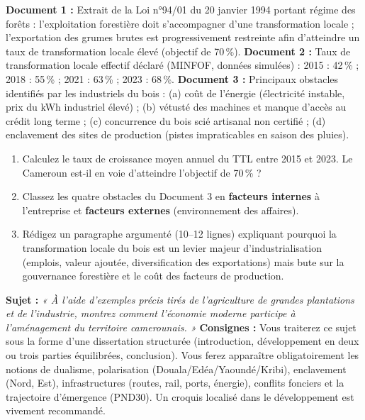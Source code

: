 \documentclass[11pt]{article}
\newcommand{\cle}[1]{{\popxbold\color{popdark}#1}}
\newcounter{popsec}
\newcounter{popsub}
\newcommand{\courssub}[1]{%
  \stepcounter{popsub}%
  \par\vspace{9pt}\noindent{\popxbold\fontsize{11.5}{13}\selectfont\color{popink}{\color{poporange}\thepopsec.\thepopsub}\hspace{6pt}#1}\par\nopagebreak\vspace{4pt}
}
\begin{document}
\begin{exercice}
\textbf{Document 1 :} Extrait de la Loi n°94/01 du 20 janvier 1994 portant régime des forêts : l'exploitation forestière doit s'accompagner d'une transformation locale ; l'exportation des grumes brutes est progressivement restreinte afin d'atteindre un taux de transformation locale élevé (objectif de 70\,\%).
\textbf{Document 2 :} Taux de transformation locale effectif déclaré (MINFOF, données simulées) : 2015 : 42\,\% ; 2018 : 55\,\% ; 2021 : 63\,\% ; 2023 : 68\,\%.
\textbf{Document 3 :} Principaux obstacles identifiés par les industriels du bois : (a) coût de l'énergie (électricité instable, prix du kWh industriel élevé) ; (b) vétusté des machines et manque d'accès au crédit long terme ; (c) concurrence du bois scié artisanal non certifié ; (d) enclavement des sites de production (pistes impraticables en saison des pluies).
\begin{enumerate}
    \item Calculez le taux de croissance moyen annuel du TTL entre 2015 et 2023. Le Cameroun est-il en voie d'atteindre l'objectif de 70\,\% ?
    \item Classez les quatre obstacles du Document 3 en \textbf{facteurs internes} à l'entreprise et \textbf{facteurs externes} (environnement des affaires).
    \item Rédigez un paragraphe argumenté (10--12 lignes) expliquant pourquoi la transformation locale du bois est un levier majeur d'industrialisation (emplois, valeur ajoutée, diversification des exportations) mais bute sur la gouvernance forestière et le coût des facteurs de production.
\end{enumerate}
\end{exercice}

\courssub{Je me prépare au Bac}

\begin{exercice}
\textbf{Sujet :} \emph{« À l'aide d'exemples précis tirés de l'agriculture de grandes plantations et de l'industrie, montrez comment l'économie moderne participe à l'aménagement du territoire camerounais. »}
\textbf{Consignes :} Vous traiterez ce sujet sous la forme d'une dissertation structurée (introduction, développement en deux ou trois parties équilibrées, conclusion). Vous ferez apparaître obligatoirement les notions de \cle{dualisme}, \cle{polarisation} (Douala/Edéa/Yaoundé/Kribi), \cle{enclavement} (Nord, Est), \cle{infrastructures} (routes, rail, ports, énergie), \cle{conflits fonciers} et la trajectoire d'\cle{émergence} (PND30). Un croquis localisé dans le développement est vivement recommandé.
\end{exercice}
\end{document}
